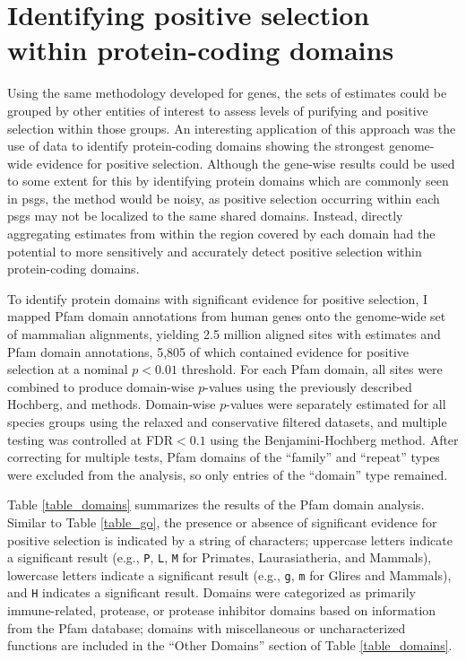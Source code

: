 \section{Identifying positive selection within protein-coding domains}

Using the same methodology developed for genes, the sets of \sw
estimates could be grouped by other entities of interest to assess
levels of purifying and positive selection within those groups. An
interesting application of this approach was the use of \sw data to
identify protein-coding domains showing the strongest genome-wide
evidence for positive selection. Although the gene-wise results could
be used to some extent for this by identifying protein domains which
are commonly seen in \acp{psg}, the method would be noisy, as positive
selection occurring within each \acp{psg} may not be localized to the
same shared domains. Instead, directly aggregating \sw estimates from
within the region covered by each domain had the potential to more
sensitively and accurately detect positive selection within
protein-coding domains.

To identify protein domains with significant evidence for positive
selection, I mapped Pfam domain annotations from human genes onto the
genome-wide set of mammalian alignments, yielding 2.5 million aligned
sites with \sw estimates and Pfam domain annotations, 5,805 of which
contained evidence for positive selection at a nominal $p<0.01$
threshold. For each Pfam domain, all sites were combined to produce
domain-wise $p$-values using the previously described Hochberg,
\psgefive and \psgeone methods. Domain-wise $p$-values were separately
estimated for all species groups using the relaxed and conservative
\sw filtered datasets, and multiple testing was controlled at
FDR$<0.1$ using the Benjamini-Hochberg method. After correcting for
multiple tests, Pfam domains of the ``family'' and ``repeat'' types
were excluded from the analysis, so only entries of the ``domain''
type remained.

Table \ref{table_domains} summarizes the results of the Pfam domain
analysis. Similar to Table \ref{table_go}, the presence or absence of
significant evidence for positive selection is indicated by a string
of characters; uppercase letters indicate a significant \psgeone
result (e.g., \texttt{P}, \texttt{L}, \texttt{M} for Primates,
Laurasiatheria, and Mammals), lowercase letters indicate a significant
\psgefive result (e.g., \texttt{g}, \texttt{m} for Glires and
Mammals), and \texttt{H} indicates a significant \psghoch
result. Domains were categorized as primarily immune-related,
protease, or protease inhibitor domains based on information from the
Pfam database; domains with miscellaneous or uncharacterized functions
are included in the ``Other Domains'' section of Table
\ref{table_domains}.

